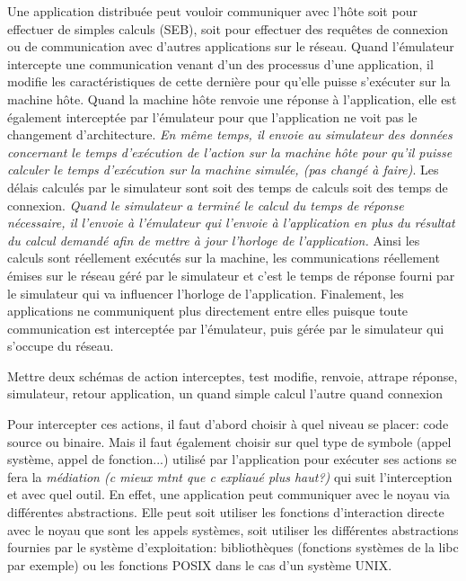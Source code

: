  Une application distribuée peut vouloir communiquer avec l'hôte soit pour
 effectuer de simples calculs (SEB), soit pour effectuer des requêtes de
 connexion ou de communication avec d'autres applications sur le réseau. Quand
 l'émulateur intercepte une communication venant d'un des processus d'une
 application, il modifie les caractéristiques de cette dernière pour qu'elle
 puisse s'exécuter sur la machine hôte. Quand la machine hôte renvoie une
 réponse à l'application, elle est également interceptée par l'émulateur pour
 que l'application ne voit pas le changement d'architecture. \textit{En même
   temps, il envoie au simulateur des données concernant le temps d'exécution de
   l'action sur la machine hôte pour qu'il puisse calculer le temps d'exécution
   sur la machine simulée, {\color{red} (pas changé à faire)}}. Les délais
 calculés par le simulateur sont soit des temps de calculs soit des temps de
 connexion. \textit{Quand le simulateur a terminé le calcul du temps de réponse
   nécessaire, il l'envoie à l'émulateur qui l'envoie à l'application en plus du
   résultat du calcul demandé afin de mettre à jour l'horloge de l'application.}
 Ainsi les calculs sont réellement exécutés sur la machine, les communications
 réellement émises sur le réseau géré par le simulateur et c'est le temps de
 réponse fourni par le simulateur qui va influencer l'horloge de
 l'application. Finalement, les applications ne communiquent plus directement
 entre elles puisque toute communication est interceptée par l'émulateur, puis
 gérée par le simulateur qui s'occupe du réseau.

{\color{red} Mettre deux schémas de action interceptes, test modifie, renvoie,
  attrape réponse, simulateur, retour application, un quand simple calcul
  l'autre quand connexion}

Pour intercepter ces actions, il faut d'abord choisir à quel niveau se placer: code source ou binaire. Mais il faut également choisir sur quel
type de symbole (appel système, appel de fonction...) utilisé par l'application
pour exécuter ses actions se fera la \textit{médiation {\color{red} (c mieux
    mtnt que c expliaué plus haut?)}} qui suit l'interception et avec quel
outil. En effet, une application peut communiquer avec le noyau via différentes
abstractions. Elle peut soit utiliser les fonctions d'interaction directe avec
le noyau que sont les appels systèmes, soit utiliser les différentes
abstractions fournies par le système d'exploitation: bibliothèques (fonctions
systèmes de la libc par exemple) ou les fonctions POSIX dans le cas d'un système
UNIX.

